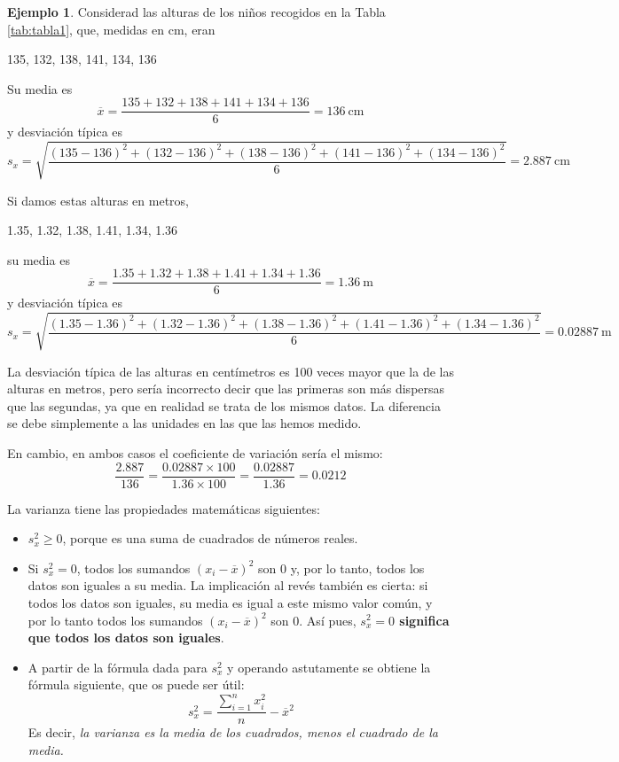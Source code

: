 \documentclass[
]{book}
\theoremstyle{definition}
\theoremstyle{definition}
\newtheorem{example}{Ejemplo}[chapter]
\theoremstyle{definition}
\theoremstyle{definition}
\theoremstyle{remark}
\begin{document}
\begin{example}
\protect\hypertarget{exm:unnamed-chunk-269}{}\label{exm:unnamed-chunk-269}Considerad las alturas de los niños recogidos en la Tabla \ref{tab:tabla1}, que, medidas en cm, eran
\end{example}

135, 132, 138, 141, 134, 136

Su media es
\[
\overline{x}=\frac{135+ 132+138+141+134+136}{6}=136\ \text{cm}
\]
y desviación típica es
\[
s_x=\sqrt{\frac{(135-136)^2+(132-136)^2+(138-136)^2+(141-136)^2+(134-136)^2}{6}}=2.887\ \text{cm}
\]

Si damos estas alturas en metros,

1.35, 1.32, 1.38, 1.41, 1.34, 1.36

su media es
\[
\overline{x}=\frac{1.35+ 1.32+1.38+1.41+1.34+1.36}{6}=1.36\ \text{m}
\]
y desviación típica es
\[
s_x=\sqrt{\frac{(1.35-1.36)^2+(1.32-1.36)^2+(1.38-1.36)^2+(1.41-1.36)^2+(1.34-1.36)^2}{6}}=0.02887\ \text{m}
\]

La desviación típica de las alturas en centímetros es 100 veces mayor que la de las alturas en metros, pero sería incorrecto decir que las primeras son más dispersas que las segundas, ya que en realidad se trata de los mismos datos. La diferencia se debe simplemente a las unidades en las que las hemos medido.

En cambio, en ambos casos el coeficiente de variación sería el mismo:
\[
\frac{2.887}{136}=\frac{0.02887\times 100}{1.36\times 100}=\frac{0.02887}{1.36}=0.0212
\]

La varianza tiene las propiedades matemáticas siguientes:

\begin{itemize}
\item
  \(s_x^2\geqslant 0\), porque es una suma de cuadrados de números reales.
\item
  Si \(s_x^2=0\), todos los sumandos \((x_i-\overline{x})^2\) son 0 y, por lo tanto, todos los datos son iguales a su media. La implicación al revés también es cierta: si todos los datos son iguales, su media es igual a este mismo valor común, y por lo tanto todos los sumandos \((x_i-\overline{x})^2\) son 0. Así pues, \textbf{\(s_x^2=0\) significa que todos los datos son iguales}.
\item
  A partir de la fórmula dada para \(s_x^2\) y operando astutamente se obtiene la fórmula siguiente, que os puede ser útil:
  \[
  s_x^2= \frac{\sum_{i=1}^n x_i^2}{n}-\overline{x}^2
  \]
  Es decir, \emph{la varianza es la media de los cuadrados, menos el cuadrado de la media.}
\end{itemize}
\end{document}
